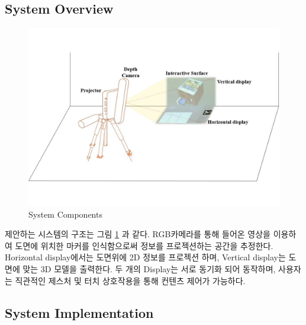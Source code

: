 \subsection{System Overview}
\begin{figure}[ht!]
	\centering
    \includegraphics[width=\textwidth]{3-System/overview}
	\caption{System Components}
    \label{fig:overview}
\end{figure}

제안하는 시스템의 구조는 그림 \ref{fig:overview} 과 같다. RGB카메라를 통해 들어온 영상을 이용하여 도면에 위치한 마커를 인식함으로써 정보를 프로젝션하는 공간을 추정한다. Horizontal display에서는 도면위에 2D 정보를 프로젝션 하며, Vertical display는 도면에 맞는 3D 모델을 출력한다. 두 개의 Display는 서로 동기화 되어 동작하며, 사용자는 직관적인 제스처 및 터치 상호작용을 통해 컨텐츠 제어가 가능하다.  

\subsection{System Implementation}

